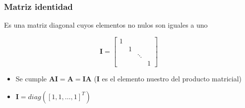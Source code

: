 \documentclass{beamer}
\begin{document}
\begin{frame}
\frametitle{Matriz identidad}
Es una matriz diagonal cuyos elementos no nulos son iguales a uno 
  
\begin{equation*}
\boldsymbol{I} = \begin{bmatrix} 1 &   &   &  \\   &  1 &   &   \\  &    & \ddots &   \\   &   &  & 1 \end{bmatrix}
\end{equation*}

\begin{itemize}
\item Se cumple $\boldsymbol{A} \boldsymbol{I} = \boldsymbol{A}  = \boldsymbol{I}\boldsymbol{A}$ ($\boldsymbol{I}$ es el elemento nuestro del producto matricial)
\item $\boldsymbol{I}= diag([1,1,\ldots, 1]^{T})$
\end{itemize}



\end{frame}
\end{document}
